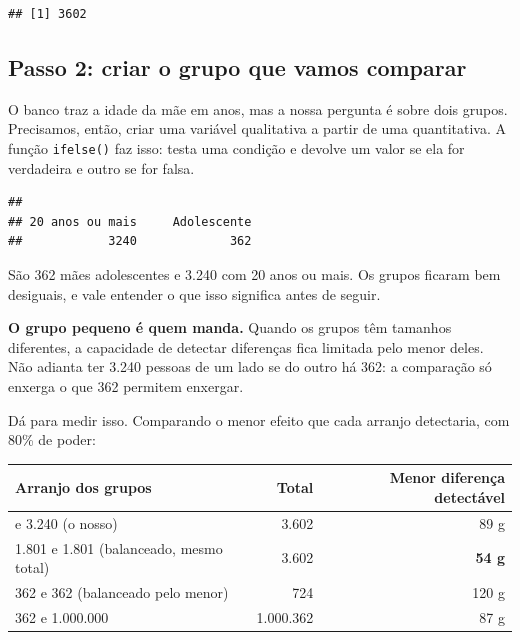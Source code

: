 \documentclass[
]{book}
\newenvironment{Shaded}{\begin{snugshade}}{\end{snugshade}}
\newcommand{\DecValTok}[1]{\textcolor[rgb]{0.00,0.00,0.81}{#1}}
\newcommand{\FunctionTok}[1]{\textcolor[rgb]{0.13,0.29,0.53}{\textbf{#1}}}
\newcommand{\NormalTok}[1]{#1}
\newcommand{\OtherTok}[1]{\textcolor[rgb]{0.56,0.35,0.01}{#1}}
\newcommand{\SpecialCharTok}[1]{\textcolor[rgb]{0.81,0.36,0.00}{\textbf{#1}}}
\newcommand{\StringTok}[1]{\textcolor[rgb]{0.31,0.60,0.02}{#1}}
\newcounter{none} %
\begin{document}
\begin{verbatim}
## [1] 3602
\end{verbatim}

\subsection{Passo 2: criar o grupo que vamos comparar}\label{passo-2-criar-o-grupo-que-vamos-comparar}

O banco traz a idade da mãe em anos, mas a nossa pergunta é sobre dois grupos. Precisamos, então, criar uma variável qualitativa a partir de uma quantitativa. A função \texttt{ifelse()} faz isso: testa uma condição e devolve um valor se ela for verdadeira e outro se for falsa.

\begin{Shaded}
\end{Shaded}

\begin{verbatim}
## 
## 20 anos ou mais     Adolescente 
##            3240             362
\end{verbatim}

São 362 mães adolescentes e 3.240 com 20 anos ou mais. Os grupos ficaram bem desiguais, e vale entender o que isso significa antes de seguir.

\textbf{O grupo pequeno é quem manda.} Quando os grupos têm tamanhos diferentes, a capacidade de detectar diferenças fica limitada pelo menor deles. Não adianta ter 3.240 pessoas de um lado se do outro há 362: a comparação só enxerga o que 362 permitem enxergar.

Dá para medir isso. Comparando o menor efeito que cada arranjo detectaria, com 80\% de poder:

{\def\LTcaptype{none} %
\begin{longtable}[]{@{}lrr@{}}
\toprule\noalign{}
Arranjo dos grupos & Total & Menor diferença detectável \\
\midrule\noalign{}
\endhead
\bottomrule\noalign{}
\endlastfoot
362 e 3.240 (o nosso) & 3.602 & 89 g \\
1.801 e 1.801 (balanceado, mesmo total) & 3.602 & \textbf{54 g} \\
362 e 362 (balanceado pelo menor) & 724 & 120 g \\
362 e 1.000.000 & 1.000.362 & 87 g \\
\end{longtable}
}
\end{document}
